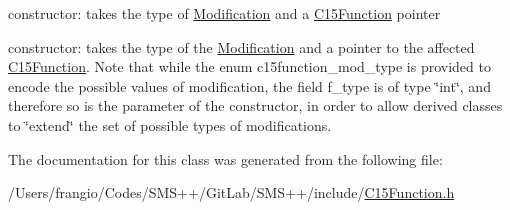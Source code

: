 constructor\+: takes the type of \mbox{\hyperlink{class_s_m_spp__di__unipi__it_1_1_modification}{Modification}} and a \mbox{\hyperlink{class_s_m_spp__di__unipi__it_1_1_c15_function}{C15\+Function}} pointer 

constructor\+: takes the type of the \mbox{\hyperlink{class_s_m_spp__di__unipi__it_1_1_modification}{Modification}} and a pointer to the affected \mbox{\hyperlink{class_s_m_spp__di__unipi__it_1_1_c15_function}{C15\+Function}}. Note that while the enum c15function\+\_\+mod\+\_\+type is provided to encode the possible values of modification, the field f\+\_\+type is of type \char`\"{}int\char`\"{}, and therefore so is the parameter of the constructor, in order to allow derived classes to \char`\"{}extend\char`\"{} the set of possible types of modifications. 

The documentation for this class was generated from the following file\+:\begin{DoxyCompactItemize}
\item 
/\+Users/frangio/\+Codes/\+S\+M\+S++/\+Git\+Lab/\+S\+M\+S++/include/\mbox{\hyperlink{_c15_function_8h}{C15\+Function.\+h}}\end{DoxyCompactItemize}

